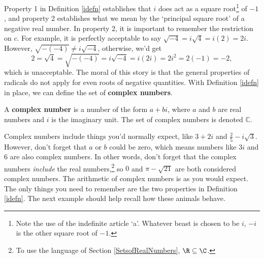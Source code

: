 \documentclass{ximera}
\begin{document}
 

Property 1 in Definition \ref{idefn} establishes that $i$ does act as a square root\footnote{Note the use of the indefinite article `a'.  Whatever beast is chosen to be $i$, $-i$ is the other square root of $-1$.} of $-1$, and property 2 establishes what we mean by the `principal square root' of a negative real number.  In property 2, it is important to remember the restriction on $c$.  For example, it is perfectly acceptable to say  $\sqrt{-4} = i \sqrt{4} = i(2) = 2i$. However, $\sqrt{-(-4)} \neq i \sqrt{-4}$, otherwise, we'd get\[ 2 = \sqrt{4} = \sqrt{-(-4)} = i \sqrt{-4} = i (2i) = 2i^2 = 2(-1) = -2,\] which is unacceptable. The moral of this story is that the general properties of radicals do not apply for even roots of negative quantities.  With Definition \ref{idefn} in place, we can define the set of \textbf{complex numbers}.

 

\begin{definition} \label{complexdefn} A \textbf{complex number} is a number of the form $a+bi$, where $a$ and $b$ are real numbers and $i$ is the imaginary unit.  The set of complex numbers is denoted $\mathbb{C}$.
\end{definition}

 

Complex numbers include things you'd normally expect, like $3+2i$ and $\frac{2}{5} - i\sqrt{3}$.  However, don't forget that $a$ or $b$ could be zero, which means numbers like $3i$ and $6$ are also complex numbers.  In other words, don't forget that the complex numbers \textit{include} the real numbers,\footnote{To use the language  of Section \ref{SetsofRealNumbers}, $\R \subseteq \C$.} so $0$ and $\pi - \sqrt{21}$ are both considered complex numbers.   The arithmetic of complex numbers is as you would expect.  The only things you need to remember are the two properties in Definition \ref{idefn}.  The next example should help recall how these animals behave.
\end{document}
